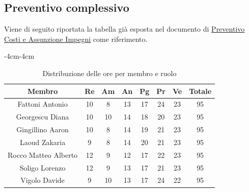 \documentclass[a4paper,12pt]{article}
\begin{document}
\subsection{Preventivo complessivo}
Viene di seguito riportata la tabella già esposta nel documento di \href{https://7-zpus.github.io/Docs/assets/1_Candidatura/PreventivoCostiEAssunzioneImpegni.pdf}{Preventivo Costi e Assunzione Impegni} come riferimento.
\begin{table}[H]
    \begin{adjustwidth}{-4cm}{-4cm}
    \centering
    \begin{tabular}{|c|c|c|c|c|c|c|c|}
        \hline
        \textbf{Membro} & \textbf{Re} & \textbf{Am} & \textbf{An} & \textbf{Pg} & \textbf{Pr} & \textbf{Ve} & \textbf{Totale} \\
        \hline
        Fattoni Antonio & 10 & 8 & 13 & 17 & 24 & 23 & 95 \\
        \hline
        Georgescu Diana & 10 & 10 & 14 & 18 & 20 & 23 & 95 \\
        \hline
        Gingillino Aaron & 10 & 8 & 14 & 19 & 21 & 23 & 95 \\
        \hline
        Laoud Zakaria & 9 & 8 & 14 & 20 & 21 & 23 & 95 \\
        \hline
        Rocco Matteo Alberto & 12 & 9 & 12 & 17 & 22 & 23 & 95 \\
        \hline
        Soligo Lorenzo & 12 & 9 & 13 & 17 & 21 & 23 & 95 \\
        \hline
        Vigolo Davide & 9 & 10 & 13 & 17 & 24 & 22 & 95 \\
        \hline
    \end{tabular}
    \caption{Distribuzione delle ore per membro e ruolo}
    \end{adjustwidth}
\end{table}
\newpage
\end{document}
